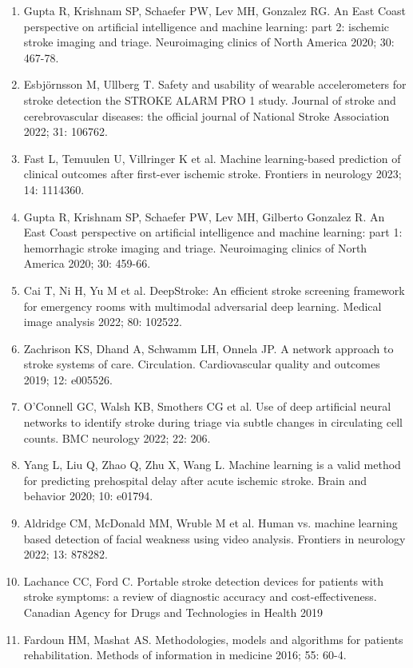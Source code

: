 {{\begin{enumerate}
    \item Gupta R, Krishnam SP, Schaefer PW, Lev MH, Gonzalez RG. An East Coast perspective on artificial intelligence and machine learning: part 2: ischemic stroke imaging and triage. Neuroimaging clinics of North America 2020; 30: 467-78.
    \item Esbjörnsson M, Ullberg T. Safety and usability of wearable accelerometers for stroke detection the STROKE ALARM PRO 1 study. Journal of stroke and cerebrovascular diseases: the official journal of National Stroke Association 2022; 31: 106762.
    \item Fast L, Temuulen U, Villringer K et al. Machine learning-based prediction of clinical outcomes after first-ever ischemic stroke. Frontiers in neurology 2023; 14: 1114360.
    \item Gupta R, Krishnam SP, Schaefer PW, Lev MH, Gilberto Gonzalez R. An East Coast perspective on artificial intelligence and machine learning: part 1: hemorrhagic stroke imaging and triage. Neuroimaging clinics of North America 2020; 30: 459-66.
    \item Cai T, Ni H, Yu M et al. DeepStroke: An efficient stroke screening framework for emergency rooms with multimodal adversarial deep learning. Medical image analysis 2022; 80: 102522.
    \item Zachrison KS, Dhand A, Schwamm LH, Onnela JP. A network approach to stroke systems of care. Circulation. Cardiovascular quality and outcomes 2019; 12: e005526.
    \item O'Connell GC, Walsh KB, Smothers CG et al. Use of deep artificial neural networks to identify stroke during triage via subtle changes in circulating cell counts. BMC neurology 2022; 22: 206.
    \item Yang L, Liu Q, Zhao Q, Zhu X, Wang L. Machine learning is a valid method for predicting prehospital delay after acute ischemic stroke. Brain and behavior 2020; 10: e01794.
    \item Aldridge CM, McDonald MM, Wruble M et al. Human vs. machine learning based detection of facial weakness using video analysis. Frontiers in neurology 2022; 13: 878282.
    \item Lachance CC, Ford C. Portable stroke detection devices for patients with stroke symptoms: a review of diagnostic accuracy and cost-effectiveness. Canadian Agency for Drugs and Technologies in Health 2019
    \item Fardoun HM, Mashat AS. Methodologies, models and algorithms for patients rehabilitation. Methods of information in medicine 2016; 55: 60-4.

\end{enumerate}}}
